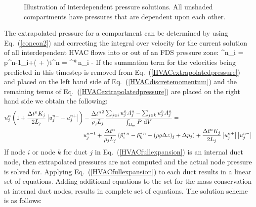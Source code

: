 \begin{figure}[ht!]
   \begin{center}
      \caption[Illustration of interdependent pressure solutions]{\label{hvacpressure} Illustration of interdependent pressure solutions.  All unshaded compartments have pressures that are dependent upon each other.}
   \end{center}
\end{figure}

The extrapolated pressure for a compartment can be determined by using Eq.~(\ref{concon2}) and correcting the integral over velocity for the current solution of
all interdependent HVAC flows into or out of an FDS pressure zone:
\be {}^n_i  = p^{n-1}_i+\left( + \right)\Delta t^n = ^{*\,n}_i - 
   \label{HVACextrapolatedpressure} \ee
If the summation term for the velocities being predicted in this timestep is removed from Eq.~(\ref{HVACextrapolatedpressure}) and placed on the left hand side of Eq.~(\ref{HVACdiscretemomentum}) and the remaining terms of Eq.~(\ref{HVACextrapolatedpressure}) are placed on the right hand side we obtain the following:
\begin{align}
   u^n_j \left( 1+\frac{\Delta t^n K_j}{2 L_j} \left| u^{n-}_j+u^{n+}_j \right| \right) &-
    \frac{\Delta {t^n}^2}{\rho_j L_j} \frac{{\sum_{j\in i} u^n_j A^n_j}-{\sum_{j\in k} u^n_j A^n_j}}{{\int_{\Omega_m} P \, \,\mathrm{d} V}}= \nonumber \\
  & u^{n-1}_j+ \frac{\Delta t^n}{\rho_j L_j}
  \left(\tilde{p}^{*\,n}_i-\tilde{p}^{*\,n}_k +  (\rho g \Delta z)_j + \Delta p_j \right) +
  \frac{\Delta t^n K_j}{2 L_j}\left|u^{n+}_j\right| \left|u^{n-}_j\right| \label{HVACfullexpansion}
\end{align}
If node $i$ or node $k$ for duct $j$ in Eq.~(\ref{HVACfullexpansion}) is an internal duct node, then extrapolated pressures are not computed and the actual node pressure is solved for.
Applying Eq.~(\ref{HVACfullexpansion}) to each duct results in a linear set of equations.
Adding additional equations to the set for the mass conservation at internal duct nodes, results in complete set of equations.
The solution scheme is as follows:

